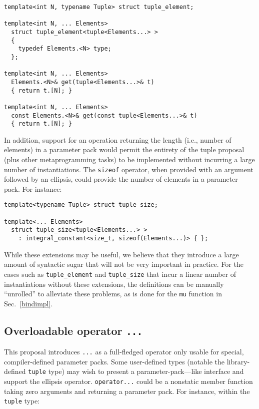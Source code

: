 \documentclass{article}
\begin{document}
\begin{verbatim}
template<int N, typename Tuple> struct tuple_element;

template<int N, ... Elements>
  struct tuple_element<tuple<Elements...> >
  {
    typedef Elements.<N> type;
  };

template<int N, ... Elements>
  Elements.<N>& get(tuple<Elements...>& t)
  { return t.[N]; }

template<int N, ... Elements>
  const Elements.<N>& get(const tuple<Elements...>& t)
  { return t.[N]; }
\end{verbatim}

In addition, support for an operation returning the length (i.e.,
number of elements) in a parameter pack would permit the entirety of
the tuple proposal~\cite{Jarvi02} (plus other metaprogramming tasks)
to be implemented without incurring a large number of
instantiations. The \texttt{sizeof} operator, when provided with an
argument followed by an ellipsis, could provide the number of elements
in a parameter pack. For instance:

\begin{verbatim}
template<typename Tuple> struct tuple_size;

template<... Elements>
  struct tuple_size<tuple<Elements...> > 
    : integral_constant<size_t, sizeof(Elements...)> { };
\end{verbatim}

While these extensions may be useful, we believe that they introduce a
large amount of syntactic sugar that will not be very important in
practice. For the cases such as \texttt{tuple\_element} and
\texttt{tuple\_size} that incur a linear number of instantiations
without these extensions, the definitions can be manually ``unrolled''
to alleviate these problems, as is done for the \texttt{mu} function
in Sec.~\ref{bindimpl}.

\subsection{Overloadable operator \texttt{...}}
This proposal introduces \texttt{...} as a full-fledged operator only
usable for special, compiler-defined parameter packs. Some
user-defined types (notable the library-defined \texttt{tuple} type)
may wish to present a parameter-pack---like interface and support the
ellipsis operator. \texttt{operator...} could be a nonstatic member
function taking zero arguments and returning a parameter pack. For
instance, within the \texttt{tuple} type:
\end{document}
